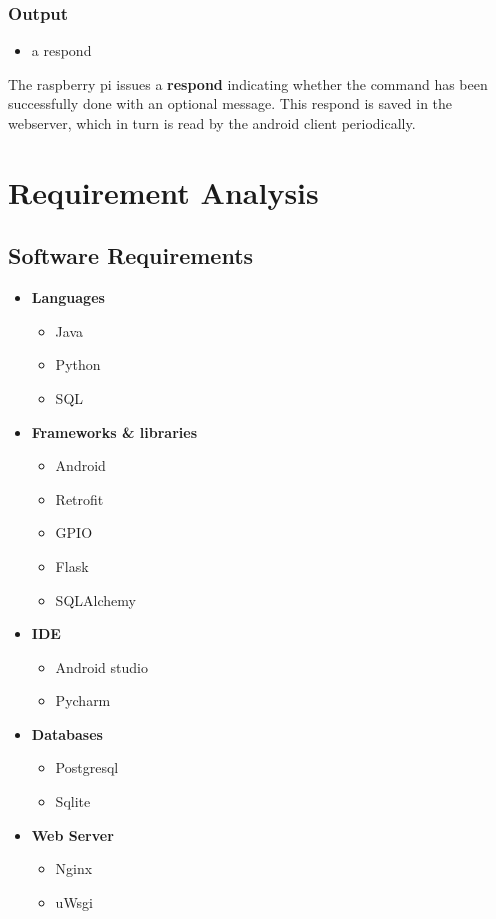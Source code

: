 \documentclass[12pt, oneside, a4paper]{book}
\newcommand\boldcolor[1]{\textcolor{bold}{\textbf{#1}}}
\begin{document}
				\subsubsection{Output}
				\begin{itemize}
					\item a respond
				\end{itemize}
				The raspberry pi issues a \textbf{respond} indicating whether the command has been successfully done with an optional message. This respond is saved in the webserver, which in turn is read by the android client periodically.  
			
		\newpage\section{Requirement Analysis}
			\subsection{Software Requirements}
			\begin{itemize}
				\item \boldcolor{Languages}
				\begin{itemize}
					\item Java
					\item Python
					\item SQL
				\end{itemize}
				
				\item \boldcolor{Frameworks \& libraries}
				\begin{itemize}
					\item Android
					\item Retrofit
					\item GPIO
					\item Flask
					\item SQLAlchemy
				\end{itemize}

				\item \boldcolor{IDE}
				\begin{itemize}
					\item Android studio
					\item Pycharm
				\end{itemize}

				\item \boldcolor{Databases}
				\begin{itemize}
					\item Postgresql
					\item Sqlite
				\end{itemize}
			
				\item \boldcolor{Web Server}
				\begin{itemize}
					\item Nginx
					\item uWsgi
				\end{itemize}
			\end{itemize}
\end{document}
